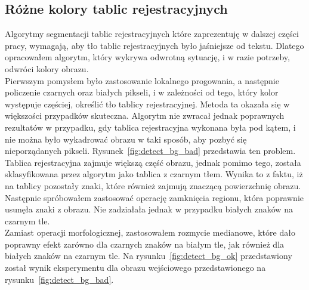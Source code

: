 \subsection{Różne kolory tablic rejestracyjnych}\label{ssec:different_backgrounds}
Algorytmy segmentacji tablic rejestracyjnych które zaprezentuję w dalszej części pracy, wymagają, aby tło tablic rejestracyjnych było jaśniejsze od tekstu. Dlatego opracowałem algorytm, który wykrywa odwrotną sytuację, i w razie potrzeby, odwróci kolory obrazu.\\
Pierwszym pomysłem było zastosowanie lokalnego progowania, a następnie policzenie czarnych oraz białych pikseli, i w zależności od tego, który kolor występuje częściej, określić tło tablicy rejestracyjnej. Metoda ta okazała się w większości przypadków skuteczna. Algorytm nie zwracał jednak poprawnych rezultatów w przypadku, gdy tablica rejestracyjna wykonana była pod kątem, i nie można było wykadrować obrazu w taki sposób, aby pozbyć się nieporządanych pikseli. Rysunek~\ref{fig:detect_bg_bad} przedstawia ten problem. Tablica rejestracyjna zajmuje większą część obrazu, jednak pomimo tego, została sklasyfikowana przez algorytm jako tablica z czarnym tłem. Wynika to z faktu, iż na tablicy pozostały znaki, które również zajmują znaczącą powierzchnię obrazu. Następnie spróbowałem zastosować operację zamknięcia regionu, która poprawnie usunęła znaki z obrazu. Nie zadziałała jednak w przypadku białych znaków na czarnym tle. \\
Zamiast operacji morfologicznej, zastosowałem rozmycie medianowe, które dało poprawny efekt zarówno dla czarnych znaków na białym tle, jak również dla białych znaków na czarnym tle. Na rysunku~\ref{fig:detect_bg_ok} przedstawiony został wynik eksperymentu dla obrazu wejściowego przedstawionego na rysunku~\ref{fig:detect_bg_bad}.

